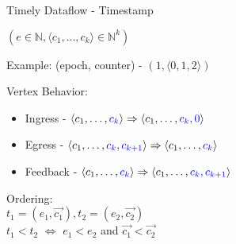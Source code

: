 \begin{frame}[t]{Timely Dataflow - Timestamp}

  \begin{center}
    \Large{$(e\in\mathbb N, \langle c_1,\dots,c_k \rangle \in\mathbb N^k)$}
  \end{center}

  \vspace{0.25cm}
  Example: (epoch, counter) - $(1, \langle 0, 1, 2 \rangle)$

  \vspace{0.5cm}
  Vertex Behavior:
  \begin{itemize}
    \item Ingress  - $\langle c_1,\dots, {\color{blue} c_k} \rangle \Rightarrow \langle c_1,\dots, {\color{blue} c_k,  0} \rangle$
    \item Egress   - $\langle c_1,\dots, {\color{blue} c_k, c_{k+1}} \rangle \Rightarrow \langle c_1,\dots, {\color{blue} c_k}\rangle$
    \item Feedback - $\langle c_1,\dots,{\color{blue} c_k} \rangle \Rightarrow \langle c_1,\dots, {\color{blue} c_k, c_{k+1}} \rangle$
  \end{itemize}

  \vspace{0.25cm}

  Ordering: \\
  $ t_1 = (e_1, \vec{c_1}), t_2 = (e_2, \vec{c_2})$ \\
  $ t_1 < t_2$ $\iff$ $e_1 < e_2$ and $\vec{c_1} < \vec{c_2}$

\end{frame}

